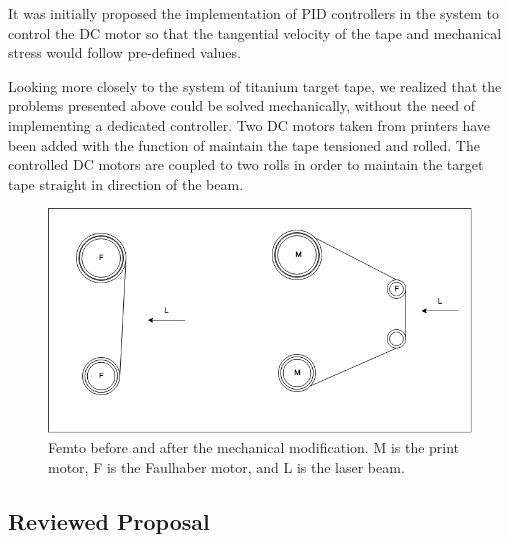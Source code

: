 \documentclass[journal]{IEEEtran}
\begin{document}
It was initially proposed the implementation of PID controllers in the system to control the DC motor so that the tangential velocity of the tape and mechanical stress would follow pre-defined values.



Looking more closely to the system of titanium target tape, we realized that the problems presented above could be solved mechanically, without the need of implementing a dedicated controller. Two DC motors taken from printers have been added with the function of maintain the tape tensioned and rolled. The controlled DC motors are coupled to two rolls in order to maintain the target tape straight in direction of the beam.

\begin{figure}[!ht]%
  \includegraphics[scale=0.37]{esquema.png}
  \centering
  \caption{Femto before and after the mechanical modification. M is the print motor, F is the Faulhaber motor, and L is the laser beam.}
\end{figure}


\subsection{Reviewed Proposal}
\end{document}
